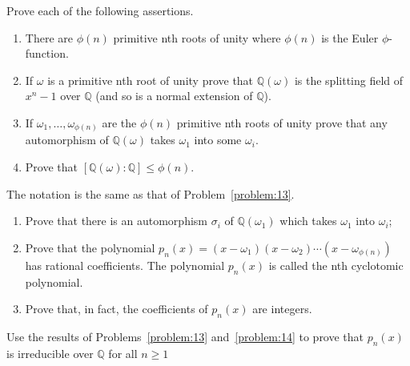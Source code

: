 \begin{problem}\label{problem:13}
Prove each of the following assertions.
\begin{enumerate}
	\item There are $\phi(n)$ primitive nth roots of unity where $\phi(n)$ is the Euler $\phi$-function.
	\item If $\omega$ is a primitive nth root of unity prove that $\mathbb{Q}(\omega)$ is the splitting field of $x^{n}-1$ over $\mathbb{Q}$ (and so is a normal extension of $\mathbb{Q}$).
	\item If $\omega_{1},\ldots,\omega_{\phi(n)}$ are the $\phi(n)$ primitive nth roots of unity prove that any automorphism of $\mathbb{Q}(\omega)$ takes $\omega_{1}$ into some $\omega_{i}$.
	\item Prove that $[\mathbb{Q}(\omega):\mathbb{Q}]\leqslant\phi(n)$.
\end{enumerate}
\end{problem}

\begin{problem}\label{problem:14}
The notation is the same as that of Problem~\ref{problem:13}.
\begin{enumerate}
	\item Prove that there is an automorphism $\sigma_{i}$ of $\mathbb{Q}(\omega_{1})$ which takes $\omega_{1}$ into $\omega_{i}$;
	\item Prove that the polynomial $p_{n}(x)=(x-\omega_{1})(x-\omega_{2})\cdots(x-\omega_{\phi(n)})$ has rational coefficients. The polynomial $p_{n}(x)$ is called the nth cyclotomic polynomial.
	\item Prove that, in fact, the coefficients of $p_{n}(x)$ are integers.
\end{enumerate}
\end{problem}

\begin{problem}\label{problem:15}
Use the results of Problems~\ref{problem:13} and~\ref{problem:14} to prove that $p_{n}(x)$ is irreducible over $\mathbb{Q}$ for all $n\geqslant{1}$
\end{problem}
